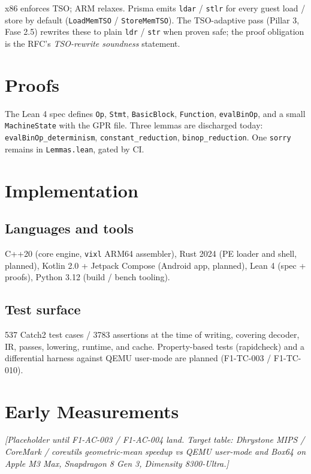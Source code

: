 \documentclass[11pt,a4paper]{article}
\begin{document}
x86 enforces TSO; ARM relaxes. Prisma emits \texttt{ldar} /
\texttt{stlr} for every guest load / store by default
(\texttt{LoadMemTSO} / \texttt{StoreMemTSO}). The TSO-adaptive
pass (Pillar 3, Fase 2.5) rewrites these to plain \texttt{ldr} /
\texttt{str} when proven safe; the proof obligation is the
RFC's \emph{TSO-rewrite soundness} statement.

\section{Proofs}
\label{sec:proofs}

The Lean 4 spec defines \texttt{Op}, \texttt{Stmt}, \texttt{BasicBlock},
\texttt{Function}, \texttt{evalBinOp}, and a small
\texttt{MachineState} with the GPR file. Three lemmas are
discharged today: \texttt{evalBinOp\_determinism},
\texttt{constant\_reduction}, \texttt{binop\_reduction}. One
\texttt{sorry} remains in \texttt{Lemmas.lean}, gated by CI.

\section{Implementation}
\label{sec:impl}

\subsection{Languages and tools}
C++20 (core engine, \texttt{vixl} ARM64 assembler), Rust 2024 (PE
loader and shell, planned), Kotlin 2.0 + Jetpack Compose (Android
app, planned), Lean 4 (spec + proofs), Python 3.12 (build / bench
tooling).

\subsection{Test surface}
537 Catch2 test cases / 3783 assertions at the time of writing,
covering decoder, IR, passes, lowering, runtime, and cache.
Property-based tests (rapidcheck) and a differential harness
against QEMU user-mode are planned (F1-TC-003 / F1-TC-010).

\section{Early Measurements}
\label{sec:eval}

\emph{[Placeholder until F1-AC-003 / F1-AC-004 land. Target table:
Dhrystone MIPS / CoreMark / coreutils geometric-mean speedup vs
QEMU user-mode and Box64 on Apple M3 Max, Snapdragon 8 Gen 3,
Dimensity 8300-Ultra.]}
\end{document}
